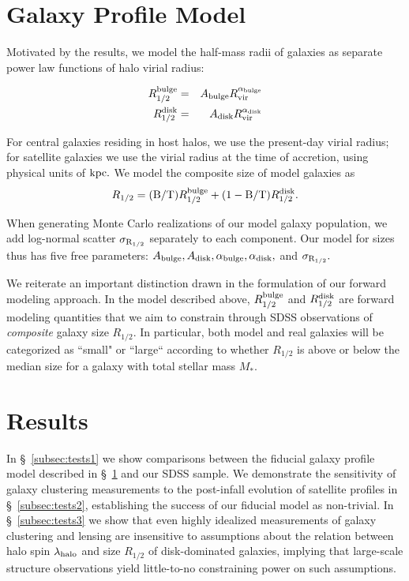 \documentclass[usenatbib,usegraphicx,letterpaper]{mn2e}
\newcommand{\beq}{\begin{equation}}
\newcommand{\eeq}{\end{equation}}
\newcommand{\rhalf}{R_{1/2}}
\newcommand{\rhalfdisk}{R_{1/2}^{\rm disk}}
\newcommand{\rhalfbulge}{R_{1/2}^{\rm bulge}}
\newcommand{\adisk}{A_{\rm disk}}
\newcommand{\abulge}{A_{\rm bulge}}
\newcommand{\alphadisk}{\alpha_{\rm disk}}
\newcommand{\alphabulge}{\alpha_{\rm bulge}}
\newcommand{\sigmarhalf}{\sigma_{\rm R_{1/2}}}
\newcommand{\rvir}{R_{\rm vir}}
\newcommand{\bt}{{\rm B/T}}
\newcommand{\mstar}{M_{\ast}}
\newcommand{\halospin}{\lambda_{\rm halo}}
\newcommand{\kpc}{{\rm kpc}}
\begin{document}
\section{Galaxy Profile Model}
\label{sec:model}

Motivated by the \citet{kravtsov13} results, we model the half-mass radii of galaxies as separate power law functions of halo virial radius:

\begin{eqnarray}
\label{eq:fiducial_model}
\rhalfbulge &=& \abulge\rvir^{\alphabulge} \\
\rhalfdisk &=& \adisk\rvir^{\alphadisk} 
\end{eqnarray}

For central galaxies residing in host halos, we use the present-day virial radius; for satellite galaxies we use the virial radius at the time of accretion, using physical units of $\kpc.$ We model the composite size of model galaxies as 
\beq
\rhalf = (\bt)\rhalfbulge + (1-\bt)\rhalfdisk.
\eeq

When generating Monte Carlo realizations of our model galaxy population, we add log-normal scatter $\sigmarhalf$ separately to each component. Our model for sizes thus has five free parameters: $\abulge, \adisk, \alphabulge, \alphadisk,$ and $\sigmarhalf.$ 

We reiterate an important distinction drawn in the formulation of our forward modeling approach. In the model described above, $\rhalfbulge$ and $\rhalfdisk$ are forward modeling quantities that we aim to constrain through SDSS observations of {\em composite} galaxy size $\rhalf.$ In particular, both model and real galaxies will be categorized as ``small" or ``large`` according to whether $\rhalf$ is above or below the median size for a galaxy with total stellar mass $\mstar.$

\section{Results}
\label{sec:results}

In \S~\ref{subsec:tests1} we show comparisons between the fiducial galaxy profile model described in \S~\ref{sec:model} and our SDSS sample. We demonstrate the sensitivity of galaxy clustering measurements to the post-infall evolution of satellite profiles in \S~\ref{subsec:tests2}, establishing the success of our fiducial model as non-trivial. In \S~\ref{subsec:tests3} we show that even highly idealized measurements of galaxy clustering and lensing are insensitive to assumptions about the relation between halo spin $\halospin$ and size $\rhalf$ of disk-dominated galaxies, implying that large-scale structure observations yield little-to-no constraining power on such assumptions. 
\end{document}
